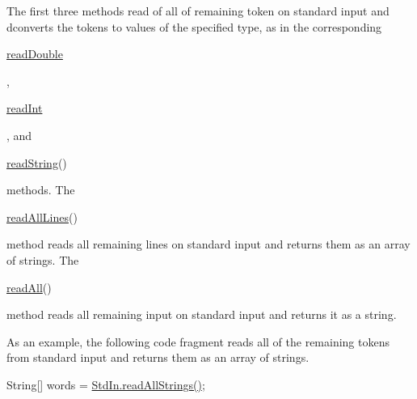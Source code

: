 The first three methods read of all of remaining token on standard input and dconverts the tokens to values of the specified type, as in the corresponding 
\begin{DoxyCode}
\hyperlink{classcom_1_1mycompany_1_1myfirstmapboxapp_1_1_std_in_a4eeca1a8d8f9ab168bbe9ddf87d9f3e5}{readDouble} 
\end{DoxyCode}
 ,
\begin{DoxyCode}
\hyperlink{classcom_1_1mycompany_1_1myfirstmapboxapp_1_1_std_in_a5eafdf9c8e8d7e60b99642cb335c9175}{readInt} 
\end{DoxyCode}
 , and
\begin{DoxyCode}
\hyperlink{classcom_1_1mycompany_1_1myfirstmapboxapp_1_1_std_in_aa787874d0065ebeb864a06b137a0250e}{readString}() 
\end{DoxyCode}
 methods. The
\begin{DoxyCode}
\hyperlink{classcom_1_1mycompany_1_1myfirstmapboxapp_1_1_std_in_af7b0715608eef376da78fb7f2b8c5a27}{readAllLines}() 
\end{DoxyCode}
 method reads all remaining lines on standard input and returns them as an array of strings. The
\begin{DoxyCode}
\hyperlink{classcom_1_1mycompany_1_1myfirstmapboxapp_1_1_std_in_ab88a5cfd29a5481fc1c3dc3a5ba72404}{readAll}() 
\end{DoxyCode}
 method reads all remaining input on standard input and returns it as a string. 

As an example, the following code fragment reads all of the remaining tokens from standard input and returns them as an array of strings. 
\begin{DoxyPre}
String[] words = \hyperlink{classcom_1_1mycompany_1_1myfirstmapboxapp_1_1_std_in_a7dc66044f2b746221de594ad33c84633}{StdIn.readAllStrings()};
\end{DoxyPre}
 

